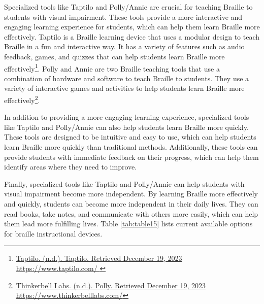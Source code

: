 Specialized tools like Taptilo and Polly/Annie are crucial for teaching Braille to students with visual impairment. These tools provide a more interactive and engaging learning experience for students, which can help them learn Braille more effectively. Taptilo is a Braille learning device that uses a modular design to teach Braille in a fun and interactive way. It has a variety of features such as audio feedback, games, and quizzes that can help students learn Braille more effectively\footnote{\raggedright \href{https://www.taptilo.com/ }{Taptilo. (n.d.). Taptilo. Retrieved December 19, 2023} \href{https://www.taptilo.com/ }{https://www.taptilo.com/ }}. Polly and Annie are two Braille teaching tools that use a combination of hardware and software to teach Braille to students. They use a variety of interactive games and activities to help students learn Braille more effectively\footnote{\raggedright \href{https://www.thinkerbelllabs.com/}{Thinkerbell Labs. (n.d.). Polly. Retrieved December 19, 2023} \href{https://www.thinkerbelllabs.com/}{https://www.thinkerbelllabs.com/}}.

In addition to providing a more engaging learning experience, specialized tools like Taptilo and Polly/Annie can also help students learn Braille more quickly. These tools are designed to be intuitive and easy to use, which can help students learn Braille more quickly than traditional methods. Additionally, these tools can provide students with immediate feedback on their progress, which can help them identify areas where they need to improve.

Finally, specialized tools like Taptilo and Polly/Annie can help students with visual impairment become more independent. By learning Braille more effectively and quickly, students can become more independent in their daily lives. They can read books, take notes, and communicate with others more easily, which can help them lead more fulfilling lives.
Table \ref{tab:table15} lists current available options for braille instructional devices.

